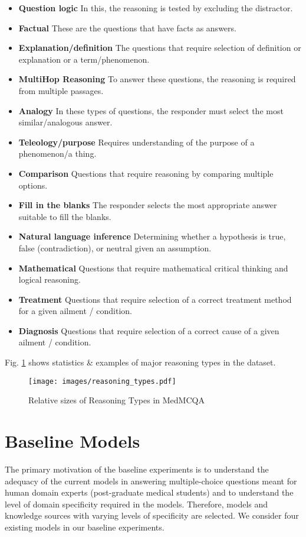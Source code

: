 \documentclass[pmlr,twocolumn,10pt]{jmlr}
\begin{document}
\begin{itemize}
    \item \textbf{Question logic} In this, the reasoning is tested by excluding the distractor.
    \item \textbf{Factual} These are the questions that have facts as answers.
    \item \textbf{Explanation/definition} The questions that require selection of definition or explanation or a term/phenomenon.
    \item \textbf{MultiHop Reasoning} To answer these questions, the reasoning is required from multiple passages.
    \item \textbf{Analogy} In these types of questions, the responder must select the most similar/analogous answer.
    \item \textbf{Teleology/purpose} Requires understanding of the purpose of a phenomenon/a thing.
    \item \textbf{Comparison} Questions that require reasoning by comparing multiple options.
    \item \textbf{Fill in the blanks} The responder selects the most appropriate answer suitable to fill the blanks.
    \item \textbf{Natural language inference} Determining whether a hypothesis is true, false (contradiction), or neutral given an assumption.
    \item \textbf{Mathematical} Questions that require mathematical critical thinking and logical reasoning.
    \item \textbf{Treatment} Questions that require selection of a correct treatment method for a given ailment / condition.
    \item \textbf{Diagnosis} Questions that require selection of a correct cause of a given ailment / condition.
    
    

\end{itemize}
Fig. \ref{fig:reasoning_types} shows statistics \& examples of major reasoning types in the dataset.



\begin{figure}
\centering
  \texttt{[image: images/reasoning\_types.pdf]}
  \caption{\footnotesize Relative sizes of Reasoning Types in MedMCQA}
  \label{fig:reasoning_types}
\end{figure}




\section{Baseline Models}
\label{apd:bm}
The primary motivation of the baseline experiments is to understand the adequacy of the current models in answering multiple-choice questions meant for human domain experts (post-graduate medical students) and to understand the level of domain specificity required in the models. Therefore, models and knowledge sources with varying levels of specificity are selected. We consider four existing models in our baseline experiments. 
\end{document}
